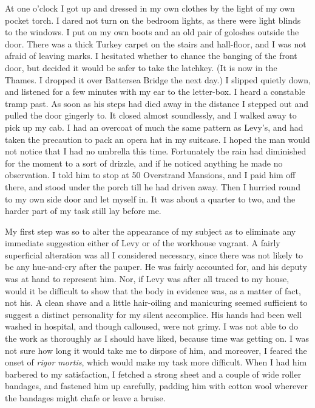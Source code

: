 At one o’clock I got up and dressed in my own clothes by the light of my own pocket torch. I dared not turn on the bedroom lights, as there were light blinds to the windows. I put on my own boots and an old pair of goloshes outside the door. There was a thick Turkey carpet on the stairs and hall-floor, and I was not afraid of leaving marks. I hesitated whether to chance the banging of the front door, but decided it would be safer to take the latchkey. (It is now in the Thames. I dropped it over Battersea Bridge the next day.) I slipped quietly down, and listened for a few minutes with my ear to the letter-box. I heard a constable tramp past. As soon as his steps had died away in the distance I stepped out and pulled the door gingerly to. It closed almost soundlessly, and I walked away to pick up my cab. I had an overcoat of much the same pattern as Levy’s, and had taken the precaution to pack an opera hat in my suitcase. I hoped the man would not notice that I had no umbrella this time. Fortunately the rain had diminished for the moment to a sort of drizzle, and if he noticed anything he made no observation. I told him to stop at 50 Overstrand Mansions, and I paid him off there, and stood under the porch till he had driven away. Then I hurried round to my own side door and let myself in. It was about a quarter to two, and the harder part of my task still lay before me.

My first step was so to alter the appearance of my subject as to eliminate any immediate suggestion either of Levy or of the workhouse vagrant. A fairly superficial alteration was all I considered necessary, since there was not likely to be any hue-and-cry after the pauper. He was fairly accounted for, and his deputy was at hand to represent him. Nor, if Levy was after all traced to my house, would it be difficult to show that the body in evidence was, as a matter of fact, not his. A clean shave and a little hair-oiling and manicuring seemed sufficient to suggest a distinct personality for my silent accomplice. His hands had been well washed in hospital, and though calloused, were not grimy. I was not able to do the work as thoroughly as I should have liked, because time was getting on. I was not sure how long it would take me to dispose of him, and moreover, I feared the onset of \textit{rigor mortis}, which would make my task more difficult. When I had him barbered to my satisfaction, I fetched a strong sheet and a couple of wide roller bandages, and fastened him up carefully, padding him with cotton wool wherever the bandages might chafe or leave a bruise.

